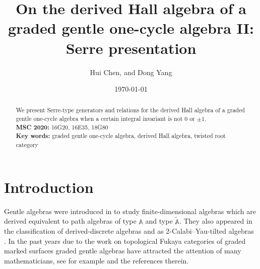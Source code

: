 \documentclass[reqno,12pt,a4paper]{amsart}
\theoremstyle{remark}
\theoremstyle{definition}
\numberwithin{equation}{section}
\begin{document}
\title[The derived Hall algebra of a graded gentle one-cycle algebra II]{On the derived Hall algebra of a graded gentle one-cycle algebra II: Serre presentation}

\author{Hui Chen, and Dong Yang}

\address{Hui Chen, School of Biomedical Engineering and Informatics, Nanjing Medical University, Nanjing 211166, P. R. China.}

\address{Dong Yang, School of Mathematics, Nanjing University, Nanjing 210093, P. R. China}
\date{\today}
\begin{abstract}
We present Serre-type generators and relations for the derived Hall algebra of a graded gentle one-cycle algebra when a certain integral invariant is not $0$ or $\pm 1$.\\
{\bf MSC 2020:} 16G20, 16E35, 18G80\\
{\bf Key words:} graded gentle one-cycle algebra, derived Hall algebra, twisted root category
\end{abstract}
\maketitle



\section{Introduction}
\label{s:intro}

Gentle algebras were introduced in \cite{AssemHappel81,AssemSkowronski87} to study finite-dimensional algebras which are derived equivalent to path algebras of type $\mathbb{A}$ and type $\tilde{\mathbb{A}}$. They also appeared in the classification of derived-discrete algebras \cite{Vossieck01,FushimiXing26} and as 2-Calabi--Yau-tilted algebras \cite{AssemBruestleCharbonneauPlamondon10}. In the past years due to the work \cite{HaidenKatzarkovKontsevich17} on topological Fukaya categories of graded marked surfaces graded gentle algebras have attracted the attention of many mathematicians, see for example \cite{LekiliPolishchuk20,OpperPlamondonSchroll18,JinSchrollWang23,Opper25} and the references therein.
\end{document}
